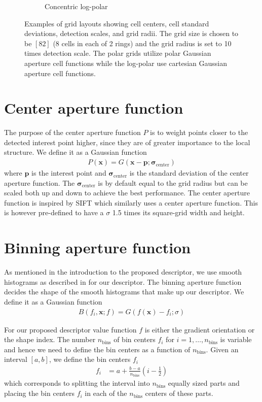 \documentclass[thesis.tex]{subfiles}
\def\x{\mathbf{x}}
\def\p{\mathbf{p}}
\def\sigmacenter{\boldsymbol{\sigma}_\text{center}}
\begin{document}
\begin{figure}[tb]
\begin{subfigure}[t]{0.32\textwidth}
		\caption{Concentric log-polar}
		\label{fig:gridTypeClp}
	\end{subfigure}
	\caption{Examples of grid layouts showing cell centers, cell standard deviations, detection scales, and grid radii. The grid size is chosen to be $[8 2]$ (8 cells in each of 2 rings) and the grid radius is set to 10 times detection scale. The polar grids utilize polar Gaussian aperture cell functions while the log-polar use cartesian Gaussian aperture cell functions.}
	\label{fig:gridType}
\end{figure}
%
\section{Center aperture function}
%
The purpose of the center aperture function $P$ is to weight points closer to the detected interest point higher, since they are of greater importance to the local structure. We define it as a Gaussian function
%
\begin{align}
P(\x) = G(\x - \p; \sigmacenter)
\end{align}
%
where $\p$ is the interest point and $\sigmacenter$ is the standard deviation of the center aperture function. The $\sigmacenter$ is by default equal to the grid radius but can be scaled both up and down to achieve the best performance. The center aperture function is inspired by SIFT \cite{lowe2004distinctive} which similarly uses a center aperture function. This is however pre-defined to have a $\sigma$ 1.5 times its square-grid width and height.
%
\section{Binning aperture function}
%
As mentioned in the introduction to the proposed descriptor, we use smooth histograms as described in  for our descriptor. The binning aperture function decides the shape of the smooth histograms that make up our descriptor. We define it as a Gaussian function
\begin{align}
	B(f_i, \x; f) = G(f(\x) - f_i; \sigma)
\end{align}

For our proposed descriptor value function $f$ is either the gradient orientation or the shape index. The number $n_\text{bins}$ of bin centers $f_i$ for $i = 1,\hdots,n_\text{bins}$ is variable and hence we need to define the bin centers as a function of $n_\text{bins}$. Given an interval $[a,b]$, we define the bin centers $f_i$
\begin{align}
	\label{eq:binCenters}
	f_i &= a + \frac{b-a}{n_\text{bins}} \left(i - \frac{1}{2} \right)
\end{align}
which corresponds to splitting the interval into $n_\text{bins}$ equally sized parts and placing the bin centers $f_i$ in each of the $n_\text{bins}$ centers of these parts.
\end{document}
